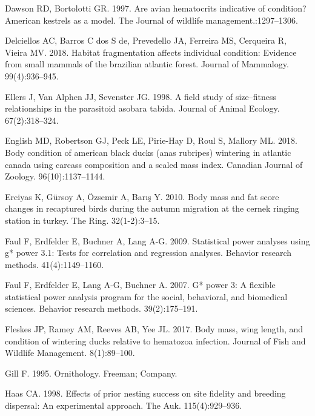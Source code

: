 \documentclass[
]{article}
\begin{document}
\leavevmode\hypertarget{ref-dawson1997avian}{}%
Dawson RD, Bortolotti GR. 1997. Are avian hematocrits indicative of
condition? American kestrels as a model. The Journal of wildlife
management.:1297--1306.

\leavevmode\hypertarget{ref-delciellos2018habitat}{}%
Delciellos AC, Barros C dos S de, Prevedello JA, Ferreira MS, Cerqueira
R, Vieira MV. 2018. Habitat fragmentation affects individual condition:
Evidence from small mammals of the brazilian atlantic forest. Journal of
Mammalogy. 99(4):936--945.

\leavevmode\hypertarget{ref-ellers1998field}{}%
Ellers J, Van Alphen JJ, Sevenster JG. 1998. A field study of
size--fitness relationships in the parasitoid asobara tabida. Journal of
Animal Ecology. 67(2):318--324.

\leavevmode\hypertarget{ref-english2018body}{}%
English MD, Robertson GJ, Peck LE, Pirie-Hay D, Roul S, Mallory ML.
2018. Body condition of american black ducks (anas rubripes) wintering
in atlantic canada using carcass composition and a scaled mass index.
Canadian Journal of Zoology. 96(10):1137--1144.

\leavevmode\hypertarget{ref-erciyas2010body}{}%
Erciyas K, Gürsoy A, Özsemir A, Barış Y. 2010. Body mass and fat score
changes in recaptured birds during the autumn migration at the cernek
ringing station in turkey. The Ring. 32(1-2):3--15.

\leavevmode\hypertarget{ref-faul2009statistical}{}%
Faul F, Erdfelder E, Buchner A, Lang A-G. 2009. Statistical power
analyses using g* power 3.1: Tests for correlation and regression
analyses. Behavior research methods. 41(4):1149--1160.

\leavevmode\hypertarget{ref-faul2007g}{}%
Faul F, Erdfelder E, Lang A-G, Buchner A. 2007. G* power 3: A flexible
statistical power analysis program for the social, behavioral, and
biomedical sciences. Behavior research methods. 39(2):175--191.

\leavevmode\hypertarget{ref-fleskes2017body}{}%
Fleskes JP, Ramey AM, Reeves AB, Yee JL. 2017. Body mass, wing length,
and condition of wintering ducks relative to hematozoa infection.
Journal of Fish and Wildlife Management. 8(1):89--100.

\leavevmode\hypertarget{ref-gill1995ornithology}{}%
Gill F. 1995. Ornithology. Freeman; Company.

\leavevmode\hypertarget{ref-haas1998effects}{}%
Haas CA. 1998. Effects of prior nesting success on site fidelity and
breeding dispersal: An experimental approach. The Auk. 115(4):929--936.
\end{document}
